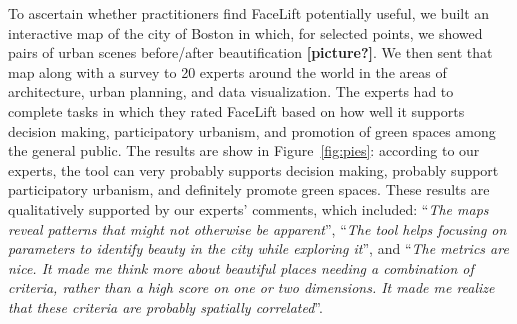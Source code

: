 To ascertain whether practitioners find FaceLift potentially useful, we built an interactive map of the city of Boston in which, for  selected points, we showed pairs of urban scenes before/after beautification \textbf{[picture?]}. We then sent that map along with a survey to 20 experts around the world in the areas of architecture, urban planning, and data visualization.  The experts had to complete tasks in which they rated FaceLift based on how well it supports decision making, participatory urbanism, and promotion of green spaces among the general public. The results are show in Figure~\ref{fig:pies}: according to our experts, the tool can very probably supports decision making, probably support participatory urbanism, and definitely promote green spaces.  These results are  qualitatively supported by our experts' comments, which included: ``\textit{The maps reveal patterns that might not otherwise be apparent}'',  ``\textit{The tool helps focusing on parameters to identify beauty in the city while exploring it}'',  and ``\textit{The metrics are nice. It made me think more about beautiful places needing a combination of criteria, rather than a high score on one or two dimensions. It made me realize that these criteria are probably spatially correlated}''.






